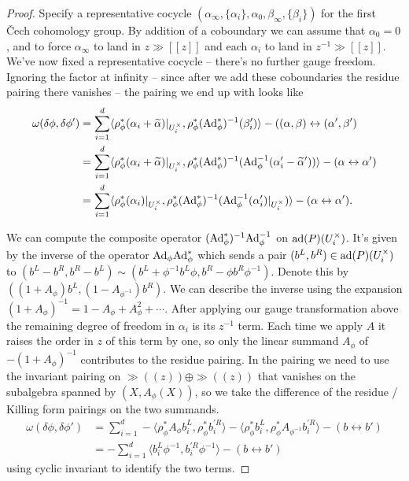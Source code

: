 \documentclass[10pt, oneside]{article}
\newcommand{\Ad}{\mr{Ad}}
\begin{document}
\begin{proof}
 Specify a representative cocycle $(\alpha_\infty, \{\alpha_i\}, \alpha_0, \beta_\infty, \{\beta_i\})$ for the first \v Cech cohomology group. By addition of a coboundary we can assume that $\alpha_0=0$, and to force $\alpha_\infty$ to land in $z\gg[[z]]$ and each $\alpha_i$ to land in $z^{-1}\gg[[z]]$.  We've now fixed a representative cocycle -- there's no further gauge freedom.  Ignoring the factor at infinity -- since after we add these coboundaries the residue pairing there vanishes -- the pairing we end up with looks like 
\begin{align*}
\omega(\delta \phi, \delta \phi') &= \sum_{i=1}^d \langle \rho_\phi^*(\alpha_i + \wt \alpha)|_{U^\times_i},\rho_\phi^* (\Ad_\phi^*)^{-1}( \beta'_i) \rangle - ((\alpha,\beta) \leftrightarrow (\alpha',\beta')\\ 
&= \sum_{i=1}^d \langle \rho_\phi^*(\alpha_i + \wt \alpha)|_{U^\times_i}, \rho_\phi^*(\Ad_\phi^*)^{-1}(\Ad_\phi^{-1}(\alpha_i' - \wt \alpha')) \rangle - (\alpha \leftrightarrow \alpha')\\
&= \sum_{i=1}^d \langle \rho_\phi^*(\alpha_i)|_{U^\times_i}, \rho_\phi^*(\Ad_\phi^*)^{-1}(\Ad_\phi^{-1}(\alpha_i')|_{U^\times_i}) \rangle - (\alpha \leftrightarrow \alpha').
\end{align*}

We can compute the composite operator $(\Ad_\phi^*)^{-1}\Ad_\phi^{-1}$ on $\mathrm{ad}(P)(U^\times_i)$.  It's given by the inverse of the operator $\Ad_\phi\Ad_\phi^*$ which sends a pair $(b^L, b^R) \in \mathrm{ad}(P)(U^\times_i)$ to $(b^L - b^R, b^R - b^L) \sim (b^L + \phi^{-1} b^L \phi, b^R - \phi b^R \phi^{-1})$.  Denote this by $((1+A_\phi)b^L,(1-A_{\phi^{-1}})b^R)$.  We can describe the inverse using the expansion $(1+A_\phi)^{-1} = 1 - A_\phi + A_\phi^2 + \cdots$.  After applying our gauge transformation above the remaining degree of freedom in $\alpha_i$ is its $z^{-1}$ term.  Each time we apply $A$ it raises the order in $z$ of this term by one, so only the linear summand $A_\phi$ of $-(1+A_\phi)^{-1}$ contributes to the residue pairing.  In the pairing we need to use the invariant pairing on $\gg((z)) \oplus \gg((z))$ that vanishes on the subalgebra spanned by $(X, A_\phi(X))$, so we take the difference of the residue / Killing form pairings on the two summands.
\begin{align*}
\omega(\delta \phi, \delta \phi') &= \sum_{i=1}^d  - \langle \rho_\phi^*A_\phi b^L_i, \rho_\phi^*b^{'R}_i \rangle - \langle \rho_\phi^*b^L_i, \rho_\phi^*A_{\phi^{-1}}b^{'R}_i \rangle- (b \leftrightarrow b') \\ 
&= - \sum_{i=1}^d \langle b^L_i\phi^{-1}, b^{'R}_i \phi^{-1} \rangle  - (b \leftrightarrow b')
\end{align*}
using cyclic invariant to identify the two terms.
\end{proof}
\end{document}
